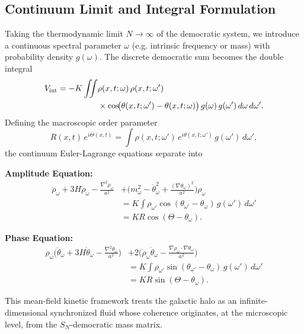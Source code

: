 \subsection{Continuum Limit and Integral Formulation}
\label{subsec:continuum}

Taking the thermodynamic limit $N\to\infty$ of the democratic system, we introduce a continuous spectral parameter $\omega$ (e.g. intrinsic frequency or mass) with probability density $g(\omega)$. The discrete democratic sum becomes the double integral
\begin{equation}
\begin{aligned}
V_{\rm int} = -K\iint
&\rho(x,t;\omega)\,\rho(x,t;\omega') \\
&\times\cos\!\bigl(\theta(x,t;\omega')-\theta(x,t;\omega)\bigr)\,
g(\omega)\,g(\omega')\,d\omega\,d\omega' .
\end{aligned}
\end{equation}
Defining the macroscopic order parameter
\begin{equation}
R(x,t)\,e^{i\Theta(x,t)}
= \int \rho(x,t;\omega')\,e^{i\theta(x,t;\omega')}\,g(\omega')\,d\omega' ,
\end{equation}
the continuum Euler-Lagrange equations separate into

\textbf{Amplitude Equation:}
\begin{equation}
\begin{aligned}
\ddot{\rho}_\omega + 3H\dot{\rho}_\omega - \frac{\nabla^2\rho_\omega}{a^2}
&+ \Big(m_\omega^2 - \dot{\theta}_\omega^2 + \frac{(\nabla\theta_\omega)^2}{a^2}\Big)\rho_\omega \\
&= K\int \rho_{\omega'}\cos(\theta_{\omega'}-\theta_\omega)\,g(\omega')\,d\omega' \\
&= K R\cos(\Theta-\theta_\omega) .
\end{aligned}
\end{equation}

\textbf{Phase Equation:}
\begin{equation}
\begin{aligned}
\rho_\omega\Big(\ddot{\theta}_\omega + 3H\dot{\theta}_\omega - \frac{\nabla^2\theta_\omega}{a^2}\Big)
&+ 2\Big(\dot{\rho}_\omega\dot{\theta}_\omega - \frac{\nabla\rho_\omega\!\cdot\!\nabla\theta_\omega}{a^2}\Big) \\
&= K\int \rho_{\omega'}\sin(\theta_{\omega'}-\theta_\omega)\,g(\omega')\,d\omega' \\
&= K R\sin(\Theta-\theta_\omega) .
\end{aligned}
\end{equation}

This mean-field kinetic framework treats the galactic halo as an infinite-dimensional synchronized fluid whose coherence originates, at the microscopic level, from the $S_N$-democratic mass matrix.